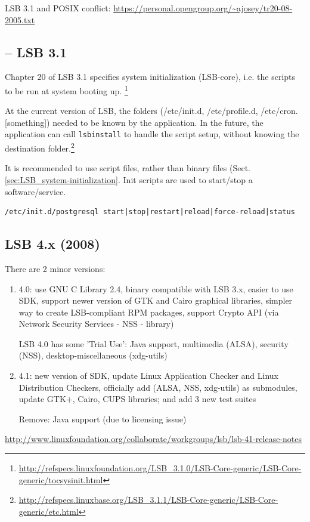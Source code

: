 LSB 3.1 and POSIX conflict:
\url{https://personal.opengroup.org/~ajosey/tr20-08-2005.txt}


\subsection{-- LSB 3.1}
\label{sec:LSB_3.1}

Chapter 20 of LSB 3.1 specifies system initialization (LSB-core), i.e. the
scripts to be run at system booting up.
 \footnote{\url{http://refspecs.linuxfoundation.org/LSB_3.1.0/LSB-Core-generic/LSB-Core-generic/tocsysinit.html}}

At the current version of LSB, the folders (/etc/init.d, /etc/profile.d,
/etc/cron.[something]) needed to be known by the application. In the future, the
application can call \verb!lsbinstall! to handle the script setup, without
knowing the destination
folder.\footnote{\url{http://refspecs.linuxbase.org/LSB_3.1.1/LSB-Core-generic/LSB-Core-generic/etc.html}}

It is recommended to use script files, rather than binary files
(Sect.\ref{sec:LSB_system-initialization}. Init scripts are used to start/stop a
software/service. 
\begin{verbatim}
/etc/init.d/postgresql start|stop|restart|reload|force-reload|status
\end{verbatim}



\subsection{LSB 4.x (2008)}
\label{sec:LSB_4.x}

There are 2 minor versions:
\begin{enumerate}
  \item 4.0: use GNU C Library 2.4, binary compatible with LSB 3.x, easier to
  use SDK, support newer version of GTK and Cairo graphical libraries, simpler way to create LSB-compliant RPM packages, support Crypto API
  (via Network Security Services - NSS - library)
  
LSB 4.0 has some 'Trial Use': Java support, multimedia (ALSA), security (NSS),
desktop-miscellaneous (xdg-utils)
  
  \item 4.1:  new version of SDK, update Linux Application Checker and Linux
  Distribution Checkers, officially add (ALSA, NSS, xdg-utils) as submodules,
  update GTK+, Cairo, CUPS libraries; and add 3 new test suites
  
Remove: Java support (due to licensing issue)
\end{enumerate}
\url{http://www.linuxfoundation.org/collaborate/workgroups/lsb/lsb-41-release-notes}

